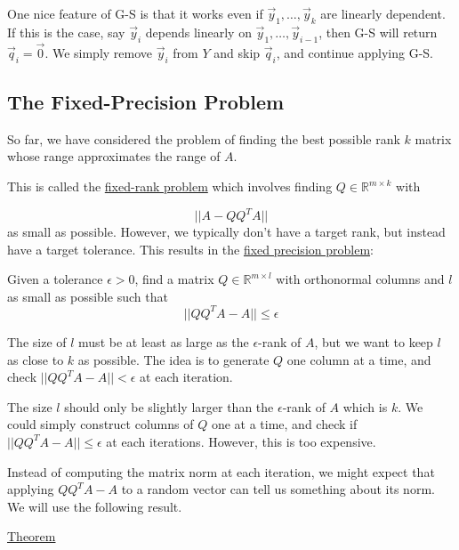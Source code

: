 One nice feature of G-S is that it works even if $\vec{y}_1, \ldots, \vec{y}_{k}$ are linearly dependent. If this is the case, say $\vec{y}_i$ depends linearly on $\vec{y}_1, \ldots, \vec{y}_{i-1}$, then G-S will return $\vec{q}_i=\vec{0}$. We simply remove $\vec{y}_i$ from $Y$ and skip $\vec{q}_i$, and continue applying G-S.

\subsection{The Fixed-Precision Problem}

So far, we have considered the problem of finding the best possible rank $k$ matrix whose range approximates the range of $A$.

This is called the \underline{fixed-rank problem} which involves finding $Q\in\mathbb{R}^{m\times k}$ with

\begin{equation*}
    ||A-QQ^TA||
\end{equation*}
as small as possible. However, we typically don't have a target rank, but instead have a target tolerance. This results in the \underline{fixed precision problem}:

\begin{displayquote}
    Given a tolerance $\epsilon > 0$, find a matrix $Q\in\mathbb{R}^{m\times l}$ with orthonormal columns and $l$ as small as possible such that
    \begin{equation*}
        ||QQ^TA-A||\leq \epsilon
    \end{equation*}
\end{displayquote}

The size of $l$ must be at least as large as the $\epsilon$-rank of $A$, but we want to keep $l$ as close to $k$ as possible. The idea is to generate $Q$ one column at a time, and check $||QQ^TA-A||<\epsilon$ at each iteration. 



The size $l$ should only be slightly larger than the $\epsilon$-rank of $A$ which is $k$. We could simply construct columns of $Q$ one at a time, and check if $|| QQ^TA-A|| \leq \epsilon$ at each iterations. However, this is too expensive.

Instead of computing the matrix norm at each iteration, we might expect that applying $QQ^TA-A$ to a random vector can tell us something about its norm. We will use the following result.

\underline{Theorem}


